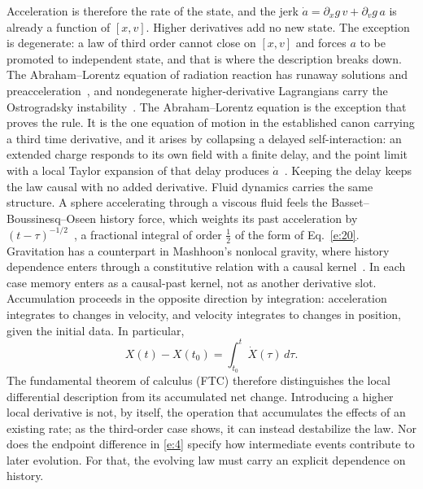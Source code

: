 \documentclass[10pt]{article}
\begin{document}
\smallskip
\noindent Acceleration is therefore the rate of the state, and the jerk $\dot a=\partial_xg\,v+\partial_vg\,a$ is already a function of $[x,v]$. Higher derivatives add no new state. The exception is degenerate: a law of third order cannot close on $[x,v]$ and forces $a$ to be promoted to independent state, and that is where the description breaks down. The Abraham--Lorentz equation of radiation reaction has runaway solutions and preacceleration~\cite{jackson}, and nondegenerate higher-derivative Lagrangians carry the Ostrogradsky instability~\cite{woodard}. The Abraham--Lorentz equation is the exception that proves the rule. It is the one equation of motion in the established canon carrying a third time derivative, and it arises by collapsing a delayed self-interaction: an extended charge responds to its own field with a finite delay, and the point limit with a local Taylor expansion of that delay produces $\dot a$~\cite{jackson}. Keeping the delay keeps the law causal with no added derivative. Fluid dynamics carries the same structure. A sphere accelerating through a viscous fluid feels the Basset--Boussinesq--Oseen history force, which weights its past acceleration by $(t-\tau)^{-1/2}$~\cite{maxey}, a fractional integral of order $\tfrac12$ of the form of Eq.~\eqref{e:20}. Gravitation has a counterpart in Mashhoon's nonlocal gravity, where history dependence enters through a constitutive relation with a causal kernel~\cite{mashhoonsym,mashhoon}. In each case memory enters as a causal-past kernel, not as another derivative slot. Accumulation proceeds in the opposite direction by integration: acceleration integrates to changes in velocity, and velocity integrates to changes in position, given the initial data. In particular,
\begin{equation}
X(t)-X(t_0)=\int_{t_0}^{t}\dot X(\tau)\,d\tau.\label{e:4}
\end{equation}
The fundamental theorem of calculus (FTC) therefore distinguishes the local differential description from its accumulated net change. Introducing a higher local derivative is not, by itself, the operation that accumulates the effects of an existing rate; as the third-order case shows, it can instead destabilize the law. Nor does the endpoint difference in \eqref{e:4} specify how intermediate events contribute to later evolution. For that, the evolving law must carry an explicit dependence on history.
\end{document}
